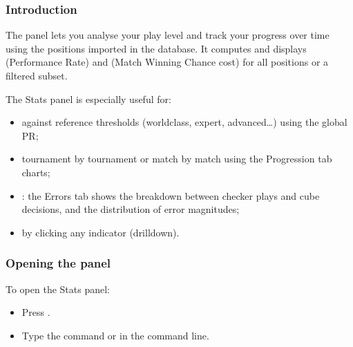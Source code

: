 \documentclass[letterpaper,10pt,english]{sphinxmanual}
\begin{document}
\subsubsection{Introduction}
\label{\detokenize{manuel:id9}}
\sphinxAtStartPar
The  panel lets you analyse your play level and track your progress over time using the positions imported in the database. It computes and displays  (Performance Rate) and  (Match Winning Chance cost) for all positions or a filtered subset.

\sphinxAtStartPar
The Stats panel is especially useful for:
\begin{itemize}
\item {} 
\sphinxAtStartPar
{} against reference thresholds (world\sphinxhyphen{}class, expert, advanced…) using the global PR;

\item {} 
\sphinxAtStartPar
{} tournament by tournament or match by match using the Progression tab charts;

\item {} 
\sphinxAtStartPar
{}: the Errors tab shows the breakdown between checker plays and cube decisions, and the distribution of error magnitudes;

\item {} 
\sphinxAtStartPar
{} by clicking any indicator (drill\sphinxhyphen{}down).

\end{itemize}


\subsubsection{Opening the panel}
\label{\detokenize{manuel:ouverture-du-panneau}}
\sphinxAtStartPar
To open the Stats panel:
\begin{itemize}
\item {} 
\sphinxAtStartPar
Press .

\item {} 
\sphinxAtStartPar
Type the command  or  in the command line.

\end{itemize}
\end{document}
